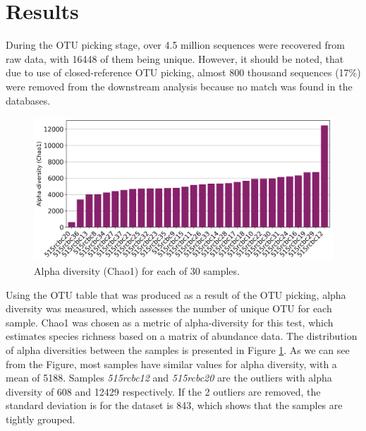 \documentclass[12pt,twocolumn]{article} %
\begin{document}
\section{Results} 
During the OTU picking stage, over 4.5 million sequences were recovered from raw data, with 16448 of them being unique. However, it should be noted, that due to use of closed-reference OTU picking, almost 800 thousand sequences (17\%) were removed from the downstream analysis because no match was found in the databases. 
\begin{figure}[ht!] %
	\includegraphics[width=\linewidth]{chao1_alpha.png}
	\caption{Alpha diversity (Chao1) for each of 30 samples.}
	\label{fig:alpha_diversity}
\end{figure}
\par
Using the OTU table that was produced as a result of the OTU picking, alpha diversity was measured, which assesses the number of unique OTU for each sample. Chao1 was chosen as a metric of alpha-diversity for this test, which estimates species richness based on a matrix of abundance data. The distribution of alpha diversities between the samples is presented in Figure \ref{fig:alpha_diversity}. As we can see from the Figure, most samples have similar values for alpha diversity, with a mean of 5188. Samples \textit{515rcbc12} and \textit{515rcbc20} are the outliers with alpha diversity of 608 and 12429 respectively. If the 2 outliers are removed, the standard deviation is for the dataset is 843, which shows that the samples are tightly grouped.
\end{document}
